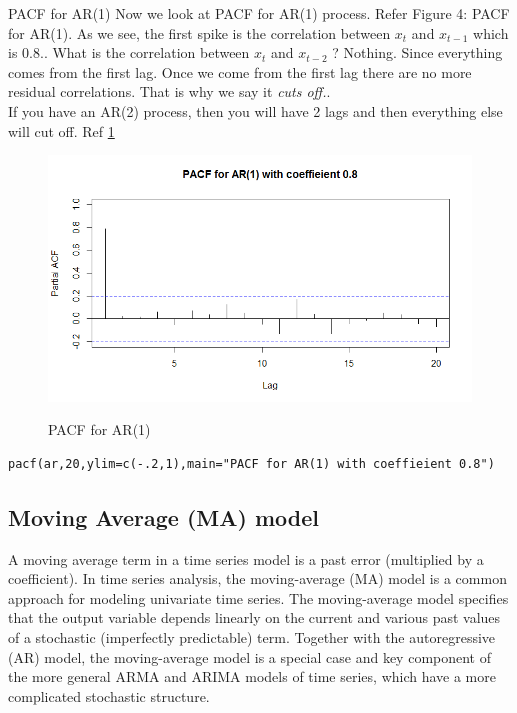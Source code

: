 \documentclass[a4paper]{article}
\theoremstyle{definition}
\begin{document}
\begin{paragraph}{PACF for AR(1)}
Now we look at PACF for AR(1) process. Refer Figure 4: PACF for AR(1). As we see, the first spike is the correlation between $ x_t $ and $ x_{t-1}  $ which is $ 0.8. $. What is the correlation between $ x_t $ and $ x_{t-2} $ ? Nothing. Since everything comes from the first lag. Once we come from the first lag there are no more residual correlations. That is why we say it \textit{cuts off.}. \\
If you have an AR(2) process, then you will have 2 lags and then everything else will cut off. Ref \ref{Pacf}
\end{paragraph}

\begin{figure}
[h]
\includegraphics[width=0.9\linewidth]{ar1_pacf}
\label{Pacf}
\caption{PACF for AR(1)}
\end{figure}


\begin{lstlisting}
pacf(ar,20,ylim=c(-.2,1),main="PACF for AR(1) with coeffieient 0.8")
\end{lstlisting}

\subsection{Moving Average (MA) model}
A moving average term in a time series model is a past error (multiplied by a coefficient). 
In time series analysis, the moving-average (MA) model is a common approach for modeling univariate time series. The moving-average model specifies that the output variable depends linearly on the current and various past values of a stochastic (imperfectly predictable) term. Together with the autoregressive (AR) model, the moving-average model is a special case and key component of the more general ARMA and ARIMA models of time series, which have a more complicated stochastic structure. 
\end{document}
